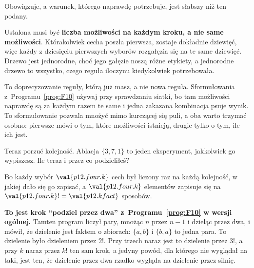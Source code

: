 \begin{fr}
\begin{ansblock}
Obowiązuje, a warunek, którego naprawdę potrzebuje, jest słabszy niż ten
podany.
\end{ansblock}

Ustalona musi być \textbf{liczba możliwości na każdym kroku, a nie same
możliwości}. Którakolwiek cecha poszła pierwsza, zostaje dokładnie dziewięć,
więc każdy z dziesięciu pierwszych wyborów rozgałęzia się na te same
dziewięć. Drzewo jest jednorodne, choć jego gałęzie noszą różne etykiety, a
jednorodne drzewo to wszystko, czego reguła iloczynu kiedykolwiek
potrzebowała.

\begin{note}
To doprecyzowanie reguły, którą już masz, a nie nowa reguła. Sformułowania
z~Programu~\ref{prog:F10} używaj przy sprawdzaniu siatki, bo tam możliwości
naprawdę są za każdym razem te same i jedna zakazana kombinacja psuje wynik.
To sformułowanie pozwala mnożyć mimo kurczącej się puli, a oba warto trzymać
osobno: pierwsze mówi o tym, które możliwości istnieją, drugie tylko o tym,
ile ich jest.
\end{note}

Teraz porzuć kolejność. Ablacja $\{3, 7, 1\}$ to jeden eksperyment, jakkolwiek
go wypiszesz. Ile teraz i przez co podzieliłeś?
\dotline
\nextframe
\end{fr}

\begin{fr}
Bo każdy wybór $\val{p12.four.k}$ cech był liczony raz na każdą kolejność, w
jakiej dało się go zapisać, a $\val{p12.four.k}$ elementów zapisuje się na
$\val{p12.four.k}! = \val{p12.kfact}$ sposobów.

\textbf{To jest krok \enquote{podziel przez dwa} z~Programu~\ref{prog:F10} w
wersji ogólnej.} Tamten program liczył pary, mnożąc $n$ przez $n-1$ i dzieląc
przez dwa, i mówił, że dzielenie jest faktem o zbiorach: $\{a, b\}$ i
$\{b, a\}$ to jedna para. To dzielenie było dzieleniem przez $2!$. Przy trzech
naraz jest to dzielenie przez $3!$, a przy $k$ naraz przez $k!$ \dash{} ten
sam krok, a jedyny powód, dla którego nie wyglądał na taki, jest ten, że
dzielenie przez dwa rzadko wygląda na dzielenie przez silnię.
\end{fr}

